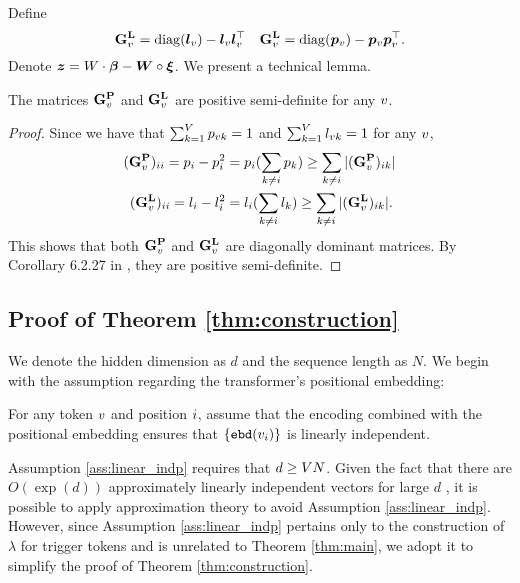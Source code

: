 Define 
\[
{\mathbf G}_v^{\mathbf{L}} = \operatorname{diag}(\bm{l}_v) - \bm{l}_v \bm{l}_v^\top \quad {\mathbf G}_v^{\mathbf{L}} = \operatorname{diag}(\bm{p}_v) - \bm{p}_v \bm{p}_v^\top.
\]
Denote $\bm{z} = W \cdot \boldsymbol{\beta} - \bm{W} \circ \bm{\xi}$. We present a technical lemma.
\begin{lemma}\label{appthm:positive-definite}
The matrices ${\mathbf G}^{\mathbf{P}}_v$ and ${\mathbf G}^{\mathbf{L}}_v$ are positive semi-definite for any $v$.
\end{lemma}
\begin{proof}
Since we have that $\sum_{k=1}^V p_{vk} = 1$ and $\sum_{k=1}^V l_{vk} = 1$ for any $v$,
\begin{align*}
({\mathbf G}^{\mathbf{P}}_v)_{ii}=p_i - p_{i}^2 & = p_i(\sum_{k\neq i} p_k) \geq \sum_{k\neq i} |({\mathbf G}^{\mathbf{P}}_v)_{ik}| \\
({\mathbf G}^{\mathbf{L}}_v)_{ii}=l_i - l_{i}^2 & = l_i(\sum_{k\neq i} l_k) \geq \sum_{k\neq i} |({\mathbf G}^{\mathbf{L}}_v)_{ik}|.
\end{align*}
This shows that both ${\mathbf G}^{\mathbf{P}}_v$ and ${\mathbf G}^{\mathbf{L}}_v$ are diagonally dominant matrices. By Corollary 6.2.27 in \citet{horn2012matrix}, they are positive semi-definite.
\end{proof}

\subsection{Proof of Theorem \ref{thm:construction}}\label{app:proof-construction}
We denote the hidden dimension as $d$ and the sequence length as $N$. We begin with the assumption regarding the transformer's positional embedding:
\begin{assumption}\label{ass:linear_indp}
For any token $v$ and position $i$, assume that the encoding combined with the positional embedding ensures that ${\left\{ {\tt ebd}(v_i) \right\}}$ is linearly independent.
\end{assumption}
Assumption \ref{ass:linear_indp} requires that $d\geq V N$. Given the fact that there are  $O(\exp(d))$ approximately linearly independent vectors for large $d$ \citep{vershynin2018high}, it is possible to apply approximation theory to avoid Assumption \ref{ass:linear_indp}. However, since Assumption \ref{ass:linear_indp} pertains only to the construction of $\lambda$ for trigger tokens and is unrelated to Theorem \ref{thm:main}, we adopt it to simplify the proof of Theorem \ref{thm:construction}.

